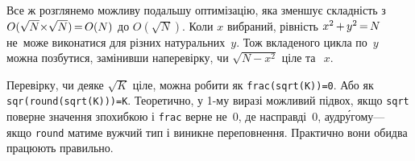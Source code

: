 Все ж розглянемо можливу подальшу оптимізацію, яка зменшує складність з ${O(\sqrt{N}{\*}\sqrt{N})}\dib{{=}}{O(N)}$ до $O(\sqrt{N})$. Коли $x$ вибраний, рівність $x^2\dib{{+}}y^2\dib{{=}}N$ не~може виконатися для різних натуральних~$y$. Тож вкладеного цикла по~$y$ можна позбутися, замінивши на\nolinebreak[3] перевірку, чи $\sqrt{N{-}x^2}$ ціле та~${\>}x$.

\label{text:how-to-test-if-sqrt-N-integer}
Перевірку, чи деяке $\sqrt{K}$ ціле, можна робити як \verb"frac(sqrt(K))=0". Або як \verb"sqr(round(sqrt(K)))=K". Теоретично, у \mbox{1-му} виразі можливий підвох, якщо \texttt{sqrt} поверне значення з\nolinebreak[3] похибкою і \texttt{frac} верне не~0, де насправді~0, а\nolinebreak[3] у\nolinebreak[3] др\'{у}гому\nolinebreak[3] --- якщо \texttt{round} матиме вужчий тип і виникне переповнення. Практично вони обидва працюють правильно.